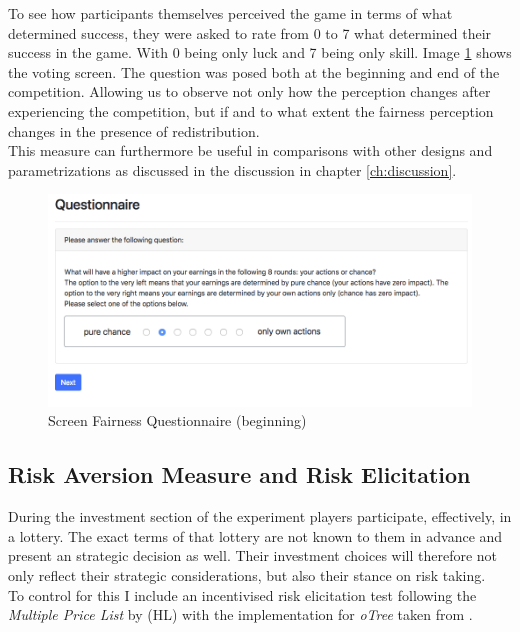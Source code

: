     To see how participants themselves perceived the game in terms of what determined success, they were asked to rate from 0 to 7 what determined their success in the game. With 0 being only luck and 7 being only skill. Image \ref{fig:fair_q} shows the voting screen. The question was posed both at the beginning and end of the competition. Allowing us to observe not only how the perception changes after experiencing the competition, but if and to what extent the fairness perception changes in the presence of redistribution.\\
    
    This measure can furthermore be useful in comparisons with other designs and parametrizations as discussed in the discussion in chapter \ref{ch:discussion}.
    
    \begin{figure}
        \centering
        \includegraphics[width=\textwidth]{graphs/Fairness_Q_Begin.png}
        \caption{Screen Fairness Questionnaire (beginning)}
        \label{fig:fair_q}
    \end{figure}
    
        
    \subsection{Risk Aversion Measure and Risk Elicitation}
    
    During the investment section of the experiment players participate, effectively, in a lottery. The exact terms of that lottery are not known to them in advance and present an strategic decision as well. Their investment choices will therefore not only reflect their strategic considerations, but also their stance on risk taking.\\
    
    To control for this I include an incentivised risk elicitation test following the \textit{Multiple Price List} by \cite{holt2002} (HL) with the implementation for \textit{oTree} taken from \cite{holzmeister2017}.\\
    

